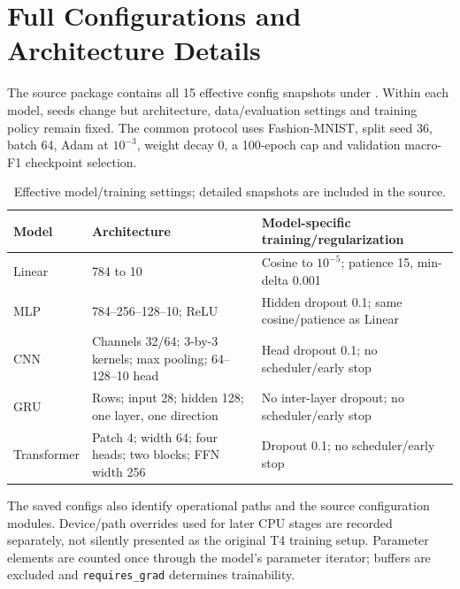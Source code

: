 \section{Full Configurations and Architecture Details}
\label{app:configs}
The source package contains all 15 effective config snapshots under
. Within each model, seeds change but architecture,
data/evaluation settings and training policy remain fixed. The common protocol
uses Fashion-MNIST, split seed 36, batch 64, Adam at \(10^{-3}\), weight decay
0, a 100-epoch cap and validation macro-F1 checkpoint selection.

\begin{table}[H]\centering\small
\caption{Effective model/training settings; detailed snapshots are included in the source.}
\begin{tabularx}{\linewidth}{lYY}
\toprule Model & Architecture & Model-specific training/regularization\\\midrule
Linear & 784 to 10 & Cosine to \(10^{-5}\); patience 15, min-delta 0.001\\
MLP & 784--256--128--10; ReLU & Hidden dropout 0.1; same cosine/patience as Linear\\
CNN & Channels 32/64; 3-by-3 kernels; max pooling; 64--128--10 head & Head dropout 0.1; no scheduler/early stop\\
GRU & Rows; input 28; hidden 128; one layer, one direction & No inter-layer dropout; no scheduler/early stop\\
Transformer & Patch 4; width 64; four heads; two blocks; FFN width 256 & Dropout 0.1; no scheduler/early stop\\
\bottomrule
\end{tabularx}
\end{table}
The saved configs also identify operational paths and the source configuration
modules. Device/path overrides used for later CPU stages are recorded separately,
not silently presented as the original T4 training setup. Parameter elements are
counted once through the model's parameter iterator; buffers are excluded and
\texttt{requires\_grad} determines trainability.
\FloatBarrier

